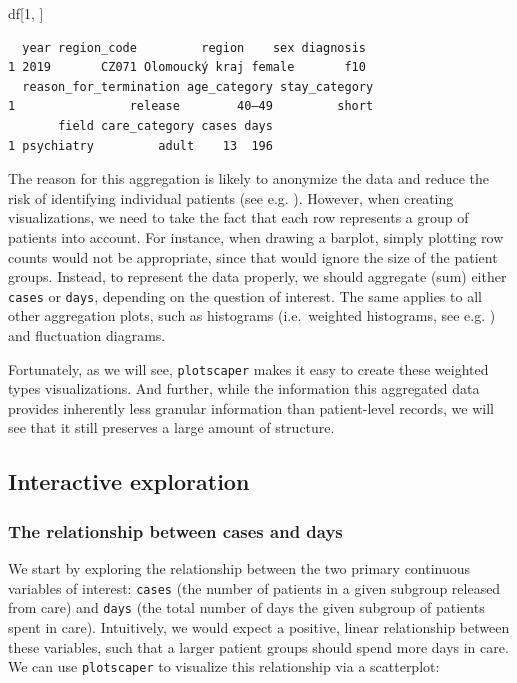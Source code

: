\documentclass[
  openany]{book}
\newenvironment{Shaded}{\begin{snugshade}}{\end{snugshade}}
\newcommand{\DecValTok}[1]{\textcolor[rgb]{0.00,0.00,0.81}{#1}}
\newcommand{\NormalTok}[1]{#1}
\theoremstyle{definition}
\theoremstyle{definition}
\theoremstyle{definition}
\theoremstyle{definition}
\theoremstyle{remark}
\begin{document}
\begin{Shaded}
\begin{Highlighting}[]
\NormalTok{df[}\DecValTok{1}\NormalTok{, ]}
\end{Highlighting}
\end{Shaded}

\begin{verbatim}
  year region_code         region    sex diagnosis
1 2019       CZ071 Olomoucký kraj female       f10
  reason_for_termination age_category stay_category
1                release        40–49         short
       field care_category cases days
1 psychiatry         adult    13  196
\end{verbatim}

The reason for this aggregation is likely to anonymize the data and reduce the risk of identifying individual patients (see e.g. ). However, when creating visualizations, we need to take the fact that each row represents a group of patients into account. For instance, when drawing a barplot, simply plotting row counts would not be appropriate, since that would ignore the size of the patient groups. Instead, to represent the data properly, we should aggregate (sum) either \texttt{cases} or \texttt{days}, depending on the question of interest. The same applies to all other aggregation plots, such as histograms (i.e.~weighted histograms, see e.g. ) and fluctuation diagrams.

Fortunately, as we will see, \texttt{plotscaper} makes it easy to create these weighted types visualizations. And further, while the information this aggregated data provides inherently less granular information than patient-level records, we will see that it still preserves a large amount of structure.

\subsection{Interactive exploration}\label{interactive-exploration}

\subsubsection{The relationship between cases and days}\label{the-relationship-between-cases-and-days}

We start by exploring the relationship between the two primary continuous variables of interest: \texttt{cases} (the number of patients in a given subgroup released from care) and \texttt{days} (the total number of days the given subgroup of patients spent in care). Intuitively, we would expect a positive, linear relationship between these variables, such that a larger patient groups should spend more days in care. We can use \texttt{plotscaper} to visualize this relationship via a scatterplot:
\end{document}
